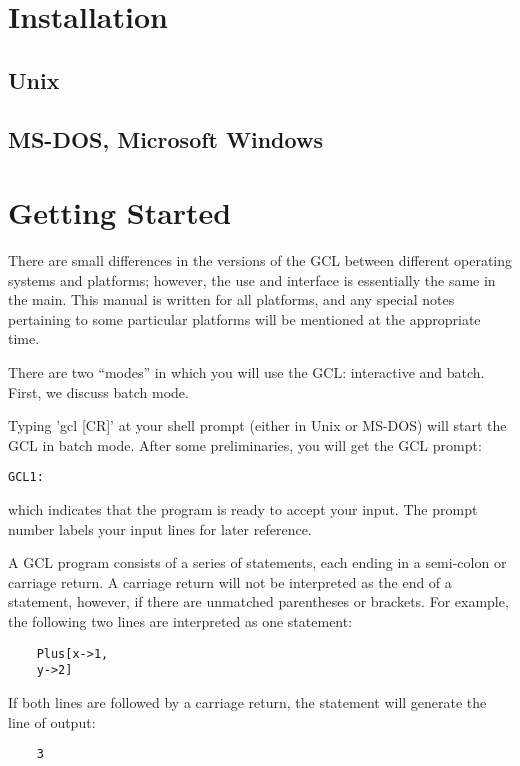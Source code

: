 \section{Installation}

\subsection{Unix}

\subsection{MS-DOS, Microsoft Windows}


\section{Getting Started}

There are small differences in the versions of the GCL between different
operating systems and platforms; however, the use and interface is
essentially the same in the main.  This manual is written for all platforms,
and any special notes pertaining to some particular platforms will be mentioned
at the appropriate time.

There are two ``modes'' in which you will use the GCL: interactive and batch.
First, we discuss batch mode.

Typing 'gcl [CR]' at your shell prompt (either in Unix or MS-DOS) will start
the GCL in batch mode.  After some preliminaries, you will get the GCL
prompt:
\begin{verbatim}
GCL1:
\end{verbatim}

which indicates that the program is ready to accept your input.  The prompt
number labels your input lines for later reference.

A GCL program consists of a series of statements, each ending in a
semi-colon or carriage return. A carriage return will not be
interpreted as the end of a statement, however, if there are unmatched
parentheses or brackets.  For example, the following two lines are
interpreted as one statement:

\begin{verbatim}
	Plus[x->1, 
	y->2]
\end{verbatim}

If both lines are followed by a carriage return, the statement will
generate the line of output:

\begin{verbatim}
	3
\end{verbatim}

